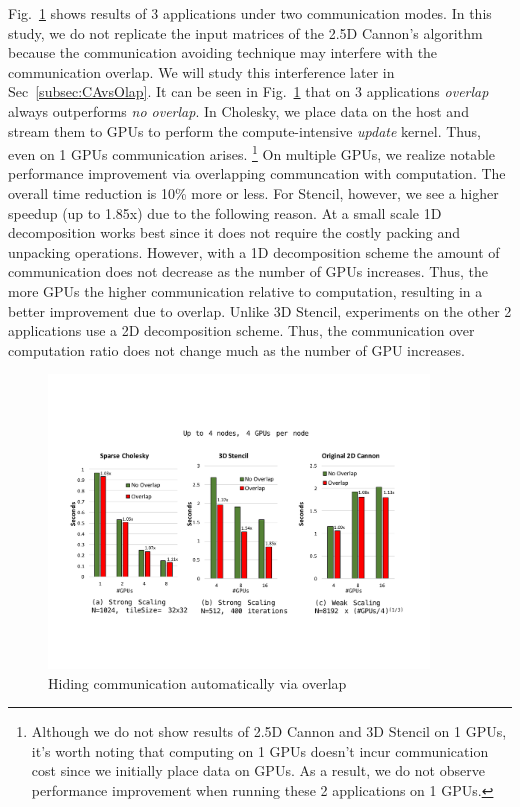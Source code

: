 Fig.~\ref{overlap} shows results of 3 applications under two communication modes.
In this study, we do not replicate the input matrices of the 2.5D Cannon's algorithm because the communication avoiding technique may interfere with the communication overlap.
We will study this interference later in Sec~\ref{subsec:CAvsOlap}.
It can be seen in Fig.~\ref{overlap} that on 3 applications {\em overlap} always outperforms {\em no overlap}.
In Cholesky, we place data on the host and stream them to GPUs to perform the compute-intensive {\em update} kernel.
Thus, even on 1 GPUs communication arises.
\footnote{Although we do not show results of 2.5D Cannon and 3D Stencil on 1 GPUs, it's worth noting that computing on 1 GPUs doesn't incur communication cost since we initially place data on GPUs.
As a result, we do not observe performance improvement when running these 2 applications on 1 GPUs.}
On multiple GPUs, we realize notable performance improvement via overlapping communcation with computation.
The overall time reduction is 10\% more or less.
For Stencil, however, we see a higher speedup (up to 1.85x) due to the following reason.
At a small scale 1D decomposition works best since it does not require the costly packing and unpacking operations.
However, with a 1D decomposition scheme the amount of communication does not decrease as the number of GPUs increases.
Thus, the more GPUs the higher communication relative to computation, resulting in a better improvement due to overlap.
Unlike 3D Stencil, experiments on the other 2 applications use a 2D decomposition scheme.
Thus, the communication over computation ratio does not change much as the number of GPU increases.

\begin{figure}[htb]
\centering
\includegraphics[width=0.9\textwidth]{figures/overlap.pdf}
\caption{Hiding communication automatically via overlap}
\label{overlap}
\end{figure}

